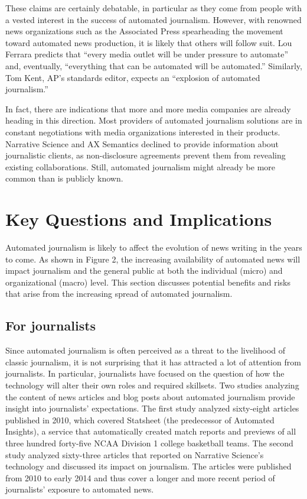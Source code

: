 \documentclass[notoc, symmetric, nobib, nols]{towcenter-guideto-book}
\begin{document}
These claims are certainly debatable, in particular as they come from people with a vested interest in the success of automated journalism. However, with renowned news organizations such as the Associated Press spearheading the movement toward automated news production, it is likely that others will follow suit. Lou Ferrara predicts that ``every media outlet will be under pressure to automate'' and, eventually, ``everything that can be automated will be automated.'' Similarly, Tom Kent, AP's standards editor, expects an ``explosion of automated journalism.''

In fact, there are indications that more and more media companies are already heading in this direction. Most providers of automated journalism solutions are in constant negotiations with media organizations interested in their products. Narrative Science and AX Semantics declined to provide information about journalistic clients, as non-disclosure agreements prevent them from revealing existing collaborations.\autocite{doerr15} Still, automated journalism might already be more common than is publicly known.
 
\chapter{Key Questions and Implications}

Automated journalism is likely to affect the evolution of news writing in the years to come. As shown in Figure 2, the increasing availability of automated news will impact journalism and the general public at both the individual (micro) and organizational (macro) level. This section discusses potential benefits and risks that arise from the increasing spread of automated journalism.

\section{For journalists}

Since automated journalism is often perceived as a threat to the livelihood of classic journalism, it is not surprising that it has attracted a lot of attention from journalists. In particular, journalists have focused on the question of how the technology will alter their own roles and required skillsets. Two studies analyzing the content of news articles and blog posts about automated journalism provide insight into journalists' expectations. The first study analyzed sixty-eight articles published in 2010, which covered Statsheet (the predecessor of Automated Insights), a service that automatically created match reports and previews of all three hundred forty-five NCAA Division 1 college basketball teams.\autocite{dalen12} The second study analyzed sixty-three articles that reported on Narrative Science's technology and discussed its impact on journalism.\autocite{carlson15} The articles were published from 2010 to early 2014 and thus cover a longer and more recent period of journalists' exposure to automated news.
\end{document}
